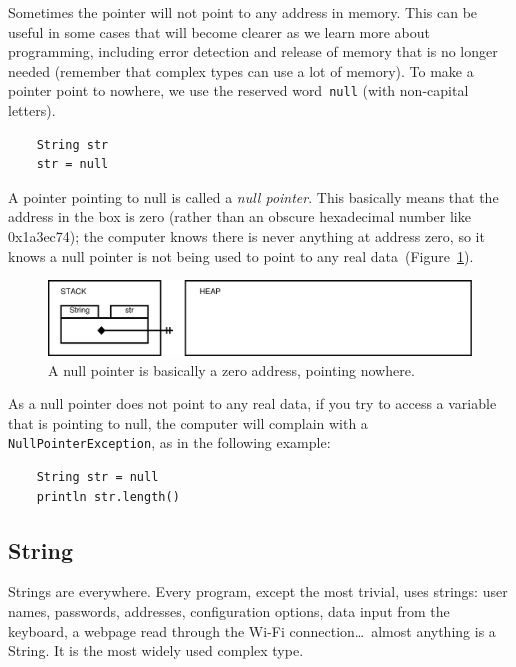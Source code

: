 Sometimes the pointer will 
not point to any address in memory. This can be useful in
some cases that will become clearer as we learn more about
programming, including error detection and release of memory that is
no longer needed (remember that complex types can use a lot of
memory). To make a pointer point to nowhere, we use the
reserved word~\verb+null+ (with non-capital letters).

\begin{verbatim}
    String str
    str = null
\end{verbatim}

A pointer pointing to null is called a \emph{null pointer}. This
basically means that the address in the box is zero (rather than an
obscure hexadecimal number like 0x1a3ec74); the computer
knows there is never anything at address zero, so it knows a null
pointer is not being used to point to any real
data~(Figure~\ref{fig:nullpiounter}).

\begin{figure}[htbp]
  \centering
  \includegraphics[width=\textwidth]{gfx/variables-string-null}
  \caption{A null pointer is basically a zero address, pointing nowhere.}
  \label{fig:nullpiounter}
\end{figure}

As a null pointer does not point to any real data, if you try to
access a variable that is pointing to null, the computer will complain
with a \verb+NullPointerException+, as in the following example: 

\begin{verbatim}
    String str = null
    println str.length()
\end{verbatim}



\subsection{String}
\label{sec:string}

Strings are everywhere. Every program, except the most trivial, uses
strings: user names, passwords, addresses, configuration options, data
input from the keyboard, a webpage read through the Wi-Fi
connection\ldots~almost anything is a String. It is the most widely
used complex type. 


